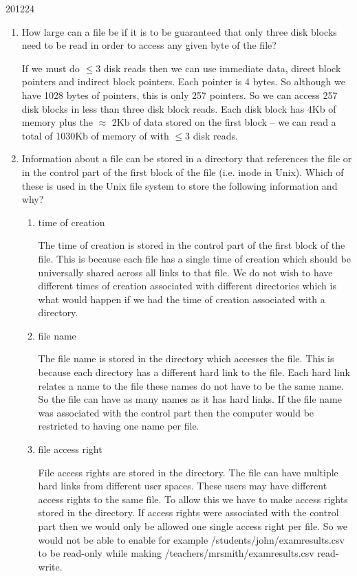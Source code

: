 \documentclass[10pt,\jkfside,a4paper]{article}
\begin{document}
\begin{examquestion}{2012}{2}{4}
\begin{enumerate}
\item How large can a file be if it is to be guaranteed that only three disk blocks need
to be read in order to access any given byte of the file?

If we must do $\leq 3$ disk reads then we can use immediate data, direct block pointers 
and indirect block pointers. Each pointer is 4 bytes. So although we have 1028 bytes of 
pointers, this is only 257 pointers. So we can access 257 disk blocks in less than 
three disk block reads. Each disk block has 4Kb of memory plus the $\approx$ 2Kb of data 
stored on the first block -- we can read a total of 1030Kb of memory of with $\leq 3$ 
disk reads.

\item Information about a file can be stored in a directory that references the file or in
the control part of the first block of the file (i.e. inode in Unix). Which of these
is used in the Unix file system to store the following information and why?

\begin{enumerate}

\item time of creation

The time of creation is stored in the control part of the first block of the file. 
This is because each file has a single time of creation which should be universally 
shared across all links to that file. We do not wish to have 
different times of creation associated with different directories which is what would 
happen if we had the time of creation associated with a directory.

\item file name

The file name is stored in the directory which accesses the file. This is because each directory 
has a different hard link to the file. Each hard link relates a name to the file these names 
do not have to be the same name. So the file can have as many names as it has hard links. 
If the file name was associated with the control part then the computer would be restricted to 
having one name per file.

\item file access right

File access rights are stored in the directory. The file can have multiple hard links from 
different user spaces. These users may have different access rights to the same file. To 
allow this we have to make access rights stored in the directory. If access rights were 
associated with the control part then we would only be allowed one single access right per 
file. So we would not be able to enable for example /students/john/examresults.csv to be 
read-only while making /teachers/mrsmith/examresults.csv read-write.


\end{enumerate}
\end{enumerate}
\end{examquestion}
\end{document}
